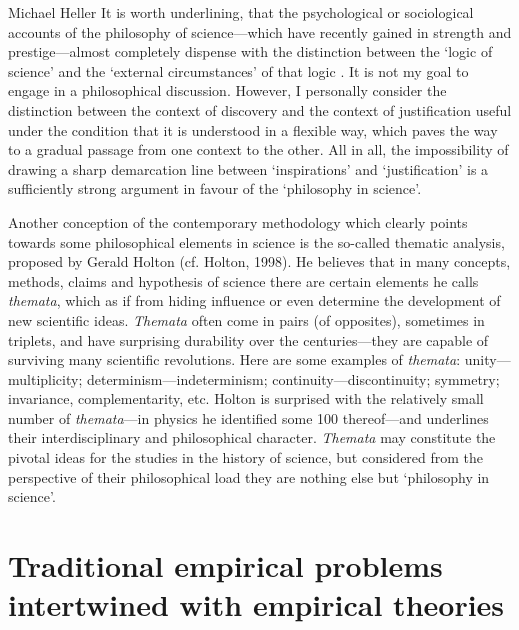 \begin{artengenv}{Michael Heller}
It is worth underlining, that the psychological or sociological accounts of the philosophy of science---which have
recently gained in strength and prestige---almost completely dispense with the distinction between the `logic of science'
and the `external circumstances' of that logic
\parencites{amsterdamski_miedzy_1983}{amsterdamski_between_1992}[cf.][]{zycinski_jezyk_1983_in_hell}.
It is not my goal to engage in a philosophical discussion. However, I personally consider the distinction between the
context of discovery and the context of justification useful under the condition that it is  understood in a flexible
way, which paves the way to a gradual passage from one  context to the other. All in all, the impossibility of drawing
a sharp demarcation line between `inspirations' and `justification' is a sufficiently strong argument in favour of the
`philosophy in science'.

Another conception of the contemporary methodology which clearly points towards some philosophical elements in
science is the so-called thematic analysis, proposed by Gerald Holton \label{ref:RNDQaGpAxlOZj}(cf. Holton, 1998). He
believes that in many concepts, methods, claims and hypothesis of science there are certain elements he calls
\textit{themata}, which as if from hiding influence or even determine the development of new scientific ideas.
\textit{Themata} often come in pairs (of opposites), sometimes in triplets, and have surprising durability over the
centuries---they are capable of surviving many scientific revolutions. Here are some examples of \textit{themata}:
unity---multiplicity; determinism---indeterminism; continuity---discontinuity; symmetry; invariance, complementarity, etc.
Holton is surprised with the relatively small number of \textit{themata}---in physics he identified some 100
thereof---and underlines their interdisciplinary and philosophical character. \textit{Themata} may constitute the
pivotal ideas for the studies in the history of science, but considered from the perspective of their philosophical
load they are nothing else but `philosophy in science'.


\section{Traditional empirical problems intertwined with empirical theories}



\end{artengenv}
